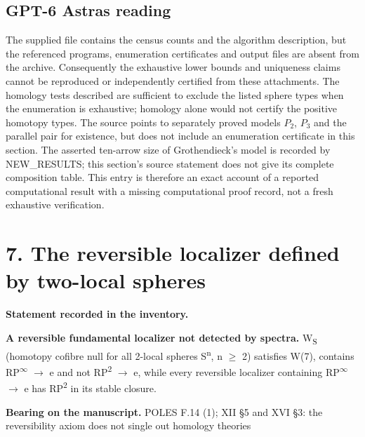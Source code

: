 \subsection*{GPT-6 Astra\textquotesingle s reading}

The supplied file contains the census counts and the algorithm description, but the referenced programs, enumeration certificates and output files are absent from the archive. Consequently the exhaustive lower bounds and uniqueness claims cannot be reproduced or independently certified from these attachments. The homology tests described are sufficient to exclude the listed sphere types when the enumeration is exhaustive; homology alone would not certify the positive homotopy types. The source points to separately proved models $P_2$, $P_3$ and the parallel pair for existence, but does not include an enumeration certificate in this section. The asserted ten-arrow size of Grothendieck's model is recorded by NEW\_RESULTS; this section's source statement does not give its complete composition table. This entry is therefore an exact account of a reported computational result with a missing computational proof record, not a fresh exhaustive verification.

\par\bigskip

\section*{7. The reversible localizer defined by two-local spheres}


\label{nr:entry7}

\noindent\textbf{Statement recorded in the inventory.}\par\smallskip

\textbf{A reversible fundamental localizer not detected by spectra.} W\textsubscript{S} (homotopy cofibre null for all 2-local spheres S\textsuperscript{n}, n \ensuremath{\geq} 2) satisfies W(7), contains RP\textsuperscript{\ensuremath{\infty}} \ensuremath{\to} e and not RP\textsuperscript{2} \ensuremath{\to} e, while every reversible localizer containing RP\textsuperscript{\ensuremath{\infty}} \ensuremath{\to} e has RP\textsuperscript{2} in its stable closure.


\noindent\textbf{Bearing on the manuscript.} POLES F.14 (1); XII §5 and XVI §3: the reversibility axiom does not single out homology theories\par\smallskip

